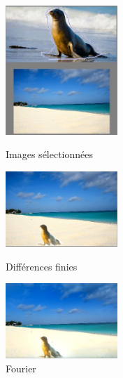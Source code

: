 \begin{figure}[!htb]
   \begin{minipage}{0.33\textwidth}
     \centering
     \includegraphics[width = 120pt]{Images/Resultats/otariePlage.png}
     \caption{Images sélectionnées}
      \end{minipage}\hfill
   \begin{minipage}{0.33\textwidth}
     \centering
     \includegraphics[width = 120pt]{Images/Resultats/OtariePlageD.png}
     \caption{Différences finies}
      \end{minipage}\hfill
   \begin{minipage}{0.33\textwidth}
     \centering
     \includegraphics[width= 120pt]{Images/Resultats/OtariePlageF.png}
     \caption{Fourier}
   \end{minipage}
\end{figure}
